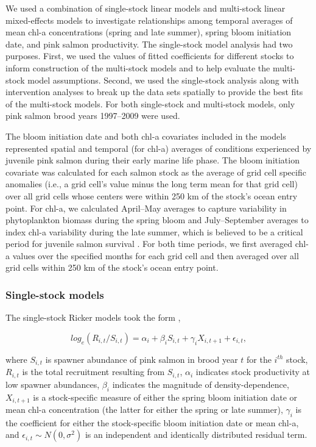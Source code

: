 We used a combination of single-stock linear models and multi-stock linear
mixed-effects models to investigate relationships among temporal averages of
mean chl-a concentrations (spring and late summer), spring bloom initiation
date, and pink salmon productivity. The single-stock model analysis had two
purposes. First, we used the values of fitted coefficients for different stocks
to inform construction of the multi-stock models and to help evaluate the
multi-stock model assumptions. Second, we used the single-stock analysis along
with intervention analyses to break up the data sets spatially to provide the
best fits of the multi-stock models. For both single-stock and multi-stock
models, only pink salmon brood years 1997--2009 were used.

The bloom initiation date and both chl-a covariates included in the models
represented spatial and temporal (for chl-a) averages of conditions experienced
by juvenile pink salmon during their early marine life phase. The bloom
initiation covariate was calculated for each salmon stock as the average of grid
cell specific anomalies (i.e., a grid cell's value minus the long term mean for
that grid cell) over all grid cells whose centers were within 250 km of the
stock's ocean entry point. For chl-a, we calculated April--May averages to
capture variability in phytoplankton biomass during the spring bloom and
July--September averages to index chl-a variability during the late summer, which
is believed to be a critical period for juvenile salmon survival
\citep{Beamish2001a, Moss2005a}. For both time periods, we first averaged chl-a
values over the specified months for each grid cell and then averaged over all
grid cells within 250 km of the stock's ocean entry point.


\subsubsection{Single-stock models}

The single-stock Ricker models took the form \citep{Adkison1996b},

\begin{equation}
log_e(R_{i,t} / S_{i,t}) = \alpha_i + \beta_i S_{i,t} + \gamma_i
X_{i,t+1} + \epsilon_{i,t}, \label{eq:bloom:2}
\end{equation}

\noindent where \(S_{i,t}\) is spawner abundance of pink salmon in brood year
\(t\) for the \(i^{th}\) stock, \(R_{i,t}\) is the total recruitment resulting
from \(S_{i,t}\), \(\alpha_i\) indicates stock productivity at low spawner
abundances, \(\beta_i\) indicates the magnitude of density-dependence,
\(X_{i,t+1}\) is a stock-specific measure of either the spring bloom initiation
date or mean chl-a concentration (the latter for either the spring or late
summer), \(\gamma_i\) is the coefficient for either the stock-specific bloom
initiation date or mean chl-a, and \(\epsilon_{i,t} \sim N(0, \sigma^2)\) is an
independent and identically distributed residual term.

